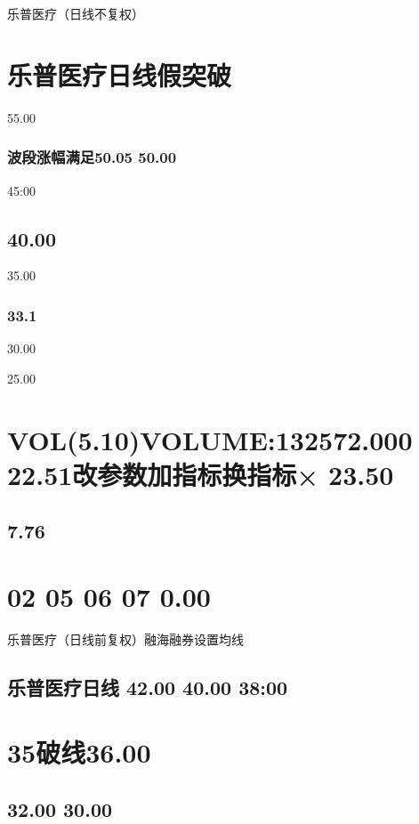 \documentclass{article}
\begin{document}
乐普医疗（日线不复权）

\section{乐普医疗日线假突破}

55.00

\subsubsection{波段涨幅满足50.05 50.00}

45:00

\subsection{40.00}

35.00

\subsubsection{33.1}

30.00

25.00

\section{VOL(5.10)VOLUME:132572.000 22.51改参数加指标换指标× 23.50}

\subsection{7.76}

\section{02 05 06 07 0.00}

乐普医疗（日线前复权）融海融券设置均线

\subsection{乐普医疗日线 42.00 40.00 38:00}

\section{35破线36.00}

\subsection{32.00 30.00}
\end{document}
